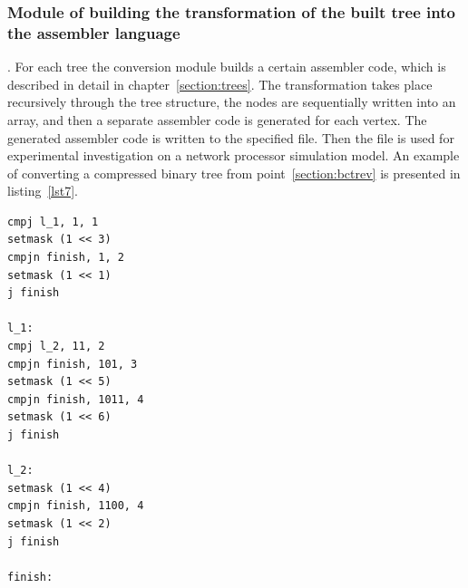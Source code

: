 \documentclass[conference]{IEEEtran}
\begin{document}
            \subsubsection{Module of building the transformation of the built tree into the assembler language}.
                For each tree the conversion module builds a certain assembler code, 
                which is described in detail in chapter~\ref{section:trees}.
                The transformation takes place recursively through the tree structure, 
                the nodes are sequentially written into an array, and then
                a separate assembler code is generated for each vertex.
                The generated assembler code is written to the specified file. 
                Then the file is used for experimental investigation on a network processor simulation model.
                An example of converting a compressed binary tree 
                from point~\ref{section:bctrev} is presented in listing~\ref{lst7}.
\\
\begin{lstlisting}[caption=Example of a compressed binary tree in assembly language., label=lst7]
cmpj l_1, 1, 1
setmask (1 << 3)
cmpjn finish, 1, 2
setmask (1 << 1)
j finish

l_1:
cmpj l_2, 11, 2
cmpjn finish, 101, 3
setmask (1 << 5)
cmpjn finish, 1011, 4
setmask (1 << 6)
j finish

l_2:
setmask (1 << 4)
cmpjn finish, 1100, 4
setmask (1 << 2)
j finish

finish:
\end{lstlisting}
\end{document}
